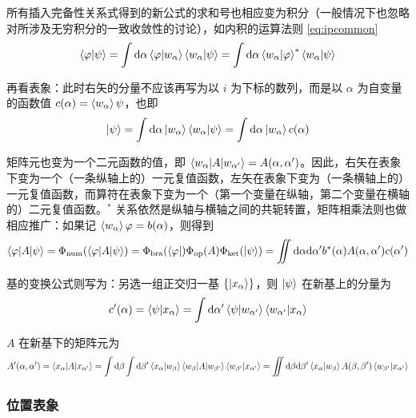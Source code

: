 \documentclass[cn,10pt,math=newtx,citestyle=gb7714-2015,bibstyle=gb7714-2015]{elegantbook}
\def\d{\mathrm d}
\def\vphi{\varphi}
\begin{document}
所有插入完备性关系式得到的新公式的求和号也相应变为积分（一般情况下也忽略对所涉及无穷积分的一致收敛性的讨论），如内积的运算法则 \ref{eq:ipcommon}
\begin{equation}
    \braket{\vphi|\psi}=\int\d\alpha\braket{\vphi|w_\alpha}\braket{w_\alpha|\psi}=\int\d\alpha\braket{w_\alpha|\vphi}^*\braket{w_\alpha|\psi}
\end{equation}

再看表象：此时右矢的分量不应该再写为以 $i$ 为下标的数列，而是以 $\alpha$ 为自变量的函数值 $c(\alpha)=\braket{w_\alpha}{\psi}$，也即
\begin{equation}
    \ket{\psi} = \int\d\alpha\ket{w_\alpha}\braket{w_\alpha|\psi} = \int\d\alpha\ket{w_\alpha}c(\alpha)
\end{equation}

矩阵元也变为一个二元函数的值，即 $\braket{w_\alpha|A|w_{\alpha'}}=A(\alpha,\alpha')$。因此，右矢在表象下变为一个（一条纵轴上的）一元复值函数，左矢在表象下变为（一条横轴上的）一元复值函数，而算符在表象下变为一个（第一个变量在纵轴，第二个变量在横轴的）二元复值函数。$^*$ 关系依然是纵轴与横轴之间的共轭转置，矩阵相乘法则也做相应推广：如果记 $\braket{w_\alpha}{\vphi}=b(\alpha)$，则得到
\begin{equation}
   \braket{\vphi|A|\psi}=\Phi_\text{num}(\braket{\vphi|A|\psi}) = \Phi_\text{bra}(\bra{\vphi})\Phi_\text{op}(A)\Phi_\text{ket}(\ket{\psi})=\iint\d\alpha\d\alpha'b^*(\alpha)A(\alpha,\alpha')c(\alpha')
\end{equation}

基的变换公式则写为：另选一组正交归一基 $\{\ket{x_\alpha}\}$，则 $\ket{\psi}$ 在新基上的分量为
\begin{equation}
   c'(\alpha)=\braket{\psi|x_\alpha} = \int\d\alpha'\braket{\psi|w_{\alpha'}}\braket{w_{\alpha'}|x_\alpha}
\end{equation}

$A$ 在新基下的矩阵元为
\begin{equation}
   A'(\alpha,\alpha')=\braket{x_\alpha|A|x_{\alpha'}} = \int\d\beta\int\d\beta'\braket{x_\alpha|w_\beta}\braket{w_\beta|A|w_{\beta'}}\braket{w_{\beta'}|x_{\alpha'}}=\iint\d\beta\d\beta'\braket{x_\alpha|w_\beta}A(\beta,\beta')\braket{w_{\beta'}|x_{\alpha'}}
\end{equation}



\subsubsection{位置表象}
\end{document}
